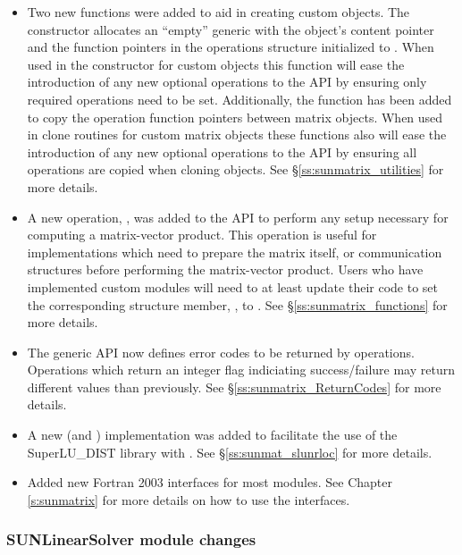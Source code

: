 \begin{itemize}
\item Two new functions were added to aid in creating custom {\sunmatrix} objects. The
constructor  allocates an ``empty'' generic {\sunmatrix} with
the object's content pointer and the function pointers in the operations
structure initialized to . When used in the constructor for custom
objects this function will ease the introduction of any new optional operations
to the {\sunmatrix} API by ensuring only required operations need to be set.
Additionally, the function  has been added to copy the
operation function pointers between matrix objects. When used in clone routines
for custom matrix objects these functions also will ease the introduction of any
new optional operations to the {\sunmatrix} API by ensuring all operations are
copied when cloning objects. See \S\ref{ss:sunmatrix_utilities} for more details.
%
\item A new operation, , was added to the {\sunmatrix} API
to perform any setup necessary for computing a matrix-vector product. This
operation is useful for {\sunmatrix} implementations which need to prepare the
matrix itself, or communication structures before performing the matrix-vector
product. Users who have implemented custom {\sunmatrix} modules will need to at
least update their code to set the corresponding  structure member,
, to . See \S\ref{ss:sunmatrix_functions} for more
details.
%
\item The generic {\sunmatrix} API now defines error codes to be returned by
{\sunmatrix} operations. Operations which return an integer flag indiciating
success/failure may return different values than previously. See
\S\ref{ss:sunmatrix_ReturnCodes} for more details.
%
\item A new {\sunmatrix} (and {\sunlinsol}) implementation was added to
facilitate the use of the SuperLU\_DIST library with {\sundials}. See
\S\ref{ss:sunmat_slunrloc} for more details.
%
\item Added new Fortran 2003 interfaces for most {\sunmatrix} modules. See Chapter
\ref{s:sunmatrix} for more details on how to use the interfaces.
\end{itemize}

\subsubsection*{SUNLinearSolver module changes}

